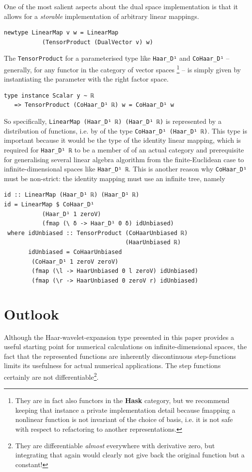 \documentclass[final,sigplan,review,anonymous]{acmart}\settopmatter{printfolios=true,printccs=false,printacmref=false}
\theoremstyle{acmplain}
\theoremstyle{acmdefinition}
\begin{document}
One of the most salient aspects about the dual space implementation is that it allows for a \emph{storable} implementation of arbitrary linear mappings.
\begin{lstlisting}
newtype LinearMap v w = LinearMap
           (TensorProduct (DualVector v) w)
\end{lstlisting}
The \lstinline`TensorProduct` for a parameterised type like \lstinline`Haar_D¹` and \lstinline`CoHaar_D¹` -- generally, for any functor in the category of vector spaces%
\footnote{They are in fact also functors in the \textbf{Hask} category, but we recommend keeping that instance a private implementation detail because fmapping a nonlinear function is not invariant of the choice of basis, i.e. it is not safe with respect to refactoring to another representations.
} -- is simply given by instantiating the parameter with the right factor space.
\begin{lstlisting}
type instance Scalar y ~ ℝ
   => TensorProduct (CoHaar_D¹ ℝ) w = CoHaar_D¹ w
\end{lstlisting}
So specifically, \lstinline`LinearMap (Haar_D¹ ℝ) (Haar_D¹ ℝ)` is represented by a distribution of functions, i.e. by of the type \lstinline`CoHaar_D¹ (Haar_D¹ ℝ)`.
This type is important because it would be the type of the identity linear mapping, which is required for \lstinline`Haar_D¹ ℝ` to be a member of of an actual category and prerequisite for generalising several linear algebra algorithm from the finite-Euclidean case to infinite-dimensional spaces like \lstinline`Haar_D¹ ℝ`.
This is another reason why \lstinline`CoHaar_D¹` must be non-strict: the identity mapping must use an infinite tree, namely
\begin{lstlisting}
id :: LinearMap (Haar_D¹ ℝ) (Haar_D¹ ℝ)
id = LinearMap $ CoHaar_D¹
           (Haar_D¹ 1 zeroV)
           (fmap (\ δ -> Haar_D¹ 0 δ) idUnbiased)
 where idUnbiased :: TensorProduct (CoHaarUnbiased ℝ)
                                   (HaarUnbiased ℝ)
       idUnbiased = CoHaarUnbiased
        (CoHaar_D¹ 1 zeroV zeroV)
        (fmap (\l -> HaarUnbiased 0 l zeroV) idUnbiased)
        (fmap (\r -> HaarUnbiased 0 zeroV r) idUnbiased)
\end{lstlisting}

\section{Outlook}
Although the Haar-wavelet-expansion type presented in this paper provides a useful starting point for numerical calculations on infinite-dimensional spaces, the fact that the represented functions are inherently discontinuous step-functions limits its usefulness for actual numerical applications. The step functions certainly are not differentiable\footnote{%
They are differentiable \emph{almost} everywhere with derivative zero, but integrating that again would clearly not give back the original function but a constant!}.
\end{document}

